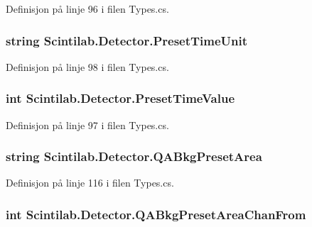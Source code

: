 Definisjon på linje 96 i filen Types.\+cs.

\hypertarget{class_scintilab_1_1_detector_a958e4c02e11a81e23684e08789f648d7}{
\subsubsection[{Preset\+Time\+Unit}]{\setlength{\rightskip}{0pt plus 5cm}string Scintilab.\+Detector.\+Preset\+Time\+Unit}}\label{class_scintilab_1_1_detector_a958e4c02e11a81e23684e08789f648d7}


Definisjon på linje 98 i filen Types.\+cs.

\hypertarget{class_scintilab_1_1_detector_aa68a1c461c3f964591f67d409463fb86}{
\subsubsection[{Preset\+Time\+Value}]{\setlength{\rightskip}{0pt plus 5cm}int Scintilab.\+Detector.\+Preset\+Time\+Value}}\label{class_scintilab_1_1_detector_aa68a1c461c3f964591f67d409463fb86}


Definisjon på linje 97 i filen Types.\+cs.

\hypertarget{class_scintilab_1_1_detector_a4546f591a7c043c96940efb203952d45}{
\subsubsection[{Q\+A\+Bkg\+Preset\+Area}]{\setlength{\rightskip}{0pt plus 5cm}string Scintilab.\+Detector.\+Q\+A\+Bkg\+Preset\+Area}}\label{class_scintilab_1_1_detector_a4546f591a7c043c96940efb203952d45}


Definisjon på linje 116 i filen Types.\+cs.

\hypertarget{class_scintilab_1_1_detector_ab6cf1a2a475e8c9f128885a1223028d4}{
\subsubsection[{Q\+A\+Bkg\+Preset\+Area\+Chan\+From}]{\setlength{\rightskip}{0pt plus 5cm}int Scintilab.\+Detector.\+Q\+A\+Bkg\+Preset\+Area\+Chan\+From}}\label{class_scintilab_1_1_detector_ab6cf1a2a475e8c9f128885a1223028d4}


